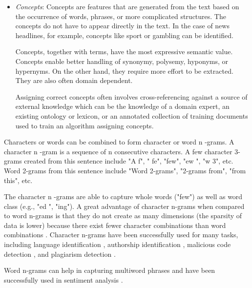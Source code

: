 \documentclass[11pt,openany,executivepaper]{book}
\begin{document}
\begin{itemize}
  Term extraction is related to the Named Entity Recognition (NER) problem, which is a subtask of Information Extraction. Its goal is to identify information units like names (typically persons, organizations, and location) and numeric expressions including time, date, money, and percent expressions \cite{205}.
  \bigskip
  
  \item \textit{Concepts}: Concepts are features that are generated from the text based on the occurrence of words, phrases, or more complicated structures. The concepts do not have to appear directly in the text. In the case of news headlines, for example, concepts like sport or gambling can be identified.
  \bigskip

  Concepts, together with terms, have the most expressive semantic value. Concepts enable better handling of synonymy, polysemy, hyponyms, or hypernyms. On the other hand, they require more effort to be extracted. They are also often domain dependent.
  \bigskip

  Assigning correct concepts often involves cross-referencing against a source of external knowledge which can be the knowledge of a domain expert, an existing ontology or lexicon, or an annotated collection of training documents used to train an algorithm assigning concepts.
\end{itemize}



Characters or words can be combined to form character or word n -grams. A character n -gram is a sequence of n consecutive characters. A few character 3-grams created from this sentence include "A f", " fe", "few", "ew ", "w 3", etc. Word 2-grams from this sentence include "Word 2-grams", "2-grams from", "from this", etc.

The character n -grams are able to capture whole words ("few") as well as word class (e.g., "ed ", "ing"). A great advantage of character n-grams when compared to word n-grams is that they do not create as many dimensions (the sparsity of data is lower) because there exist fewer character combinations than word combinations \cite{139}. Character n-grams have been successfully used for many tasks, including language identification \cite{38}, authorship identification \cite{118}, malicious code detection \cite{223}, and plagiarism detection \cite{17}.

Word n-grams can help in capturing multiword phrases \cite{163} and have been successfully used in sentiment analysis \cite{273}.
\end{document}
